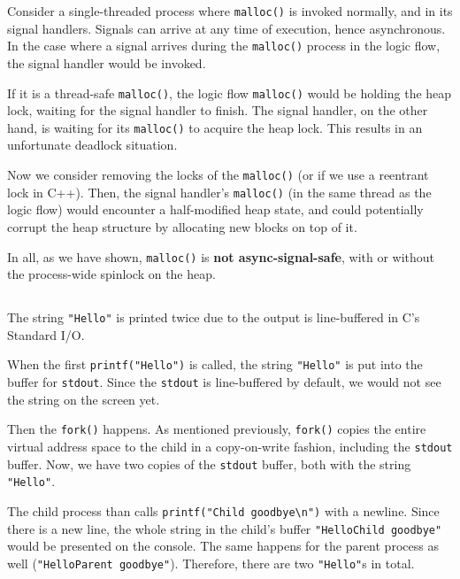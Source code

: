 \documentclass[12pt]{article}
\begin{document}
Consider a single-threaded process where \texttt{malloc()} is invoked normally, and in its signal handlers. Signals can arrive at any time of execution, hence asynchronous. In the case where a signal arrives during the \texttt{malloc()} process in the logic flow, the signal handler would be invoked. 

If it is a thread-safe \texttt{malloc()}, the logic flow \texttt{malloc()} would be holding the heap lock, waiting for the signal handler to finish. The signal handler, on the other hand, is waiting for its \texttt{malloc()} to acquire the heap lock. This results in an unfortunate deadlock situation.

Now we consider removing the locks of the \texttt{malloc()} (or if we use a reentrant lock in C++). Then, the signal handler's \texttt{malloc()} (in the same thread as the logic flow) would encounter a half-modified heap state, and could potentially corrupt the heap structure by allocating new blocks on top of it.

In all, as we have shown, \texttt{malloc()} is \textbf{not async-signal-safe}, with or without the process-wide spinlock on the heap.

\subsection{}

\subsubsection{}

The string \texttt{"Hello"} is printed twice due to the output is line-buffered in C's Standard I/O.

When the first \texttt{printf("Hello")} is called, the string \texttt{"Hello"} is put into the buffer for \texttt{stdout}. Since the \texttt{stdout} is line-buffered by default, we would not see the string on the screen yet.

Then the \texttt{fork()} happens. As mentioned previously, \texttt{fork()} copies the entire virtual address space to the child in a copy-on-write fashion, including the \texttt{stdout} buffer. Now, we have two copies of the \texttt{stdout} buffer, both with the string \texttt{"Hello"}.

The child process than calls \texttt{printf("Child goodbye\textbackslash n")} with a newline. Since there is a new line, the whole string in the child's buffer \texttt{"HelloChild goodbye"} would be presented on the console. The same happens for the parent process as well (\texttt{"HelloParent goodbye"}). Therefore, there are two \texttt{"Hello"}s in total.
\end{document}
